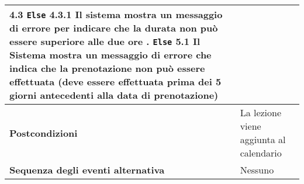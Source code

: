 \documentclass[11pt,a4paper]{report}
\begin{document}
\begin{table}[h!]
\begin{tabular}{|p{4.2cm}|p{10.2cm}|}
\hspace*{0.5cm} 4.3 \texttt{Else} \newline
\hspace*{1cm} 4.3.1 Il sistema mostra un messaggio di errore per indicare che la durata non può essere superiore alle due ore \newline
5. \texttt{Else} \newline
\hspace*{0.5cm} 5.1 Il Sistema mostra un messaggio di errore che indica che la prenotazione non può essere effettuata (deve essere effettuata prima dei 5 giorni antecedenti alla data di prenotazione) \\ \hline
\textbf{Postcondizioni} & La lezione viene aggiunta al calendario \\ \hline
\textbf{Sequenza degli eventi alternativa} & Nessuno \\ \hline
\end{tabular}
\end{table}

\newpage

\end{document}
